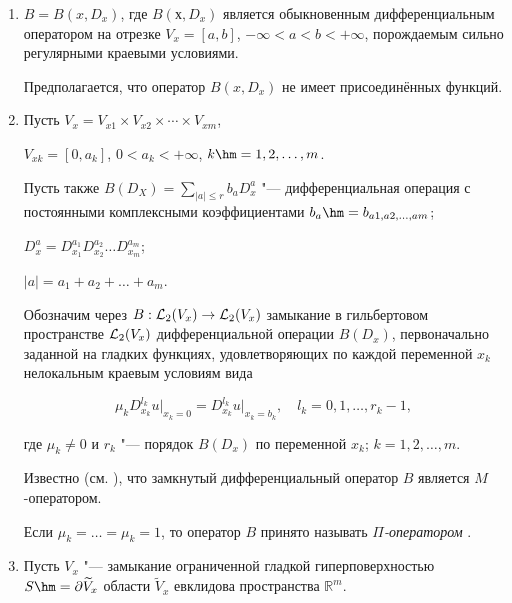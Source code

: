 \begin{enumerate}

\item[1.]

$B=B(x, D_x)$, где $B(х, D_x)$ является обыкновенным дифференциальным оператором на отрезке $V_x=[a, b]$, $-\infty<a<b<+\infty$, порождаемым сильно регулярными краевыми условиями. 

Предполагается, что оператор $B(x,D_x)$ не имеет присоединённых функций.



\item[2.]

Пусть $V_x=V_{x1}\times V_{x2}\times\cdots\times V_{xm}$, 

$V_{xk}=[0,a_k]$, $0<a_k<+\infty$, $k\hm =1, 2, \dots,m$. 

Пусть также $B(D_X)=\sum _{|a|\le r}{b_a D_x^a}$ "--- дифференциальная операция с постоянными комплексными коэффициентами $b_a\hm =b_{a1,a2,\dots,am}$; 

$D_x^a=D_{x_1}^{a_1}D_{x_2}^{a_2}\ldots D_{x_m}^{a_m}$; 

$|a|=a_1+a_2+\dots+a_m$. 

Обозначим через $B:{\cal L}_2(V_x)\to{\cal L}_2(V_x)$ замыкание в гильбертовом пространстве ${\cal L}_2(V_x)$ дифференциальной операции $B(D_x)$, первоначально заданной на гладких функциях, удовлетворяющих по каждой переменной $x_k$ нелокальным краевым условиям вида

\begin{equation}

\label{kor:eq3}

\mu_k D_{x_k}^{l_k}u\bigr|_{x_k=0} =D_{x_k}^{l_k}u\bigr|_{x_k=b_k} , \quad l_k=0, 1, \dots, r_k-1,

\end{equation}

где $\mu_k\ne0$ и $r_k$ "--- порядок $B(D_x)$ по переменной $x_k$; $k=1, 2, \dots,m$. 

Известно (см. \cite{kor:bib3, kor:bib13}), что замкнутый дифференциальный оператор $B$ является $M$-оператором. 

Если $\mu_k=\dots=\mu_k=1$, то оператор $B$ принято называть \textit{$\Pi$-оператором} \cite{kor:bib2}.



\item[3.]

Пусть $V_x$ "--- замыкание ограниченной гладкой гиперповерхностью $S \hm=\partial \widetilde{V}_x$  области $\widetilde{V}_x$ евклидова пространства $\mathbb{R}^m$. 


\end{enumerate}
